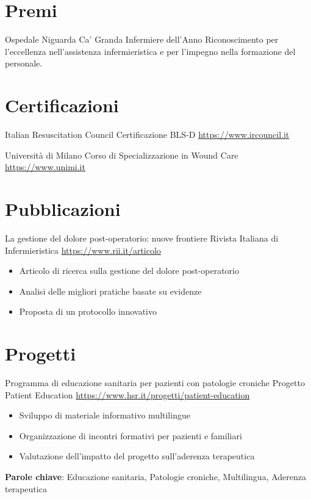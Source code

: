 \documentclass[a4paper, serif, 10pt]{moderncv}
\begin{document}
\section{Premi}

        {Ospedale Niguarda Ca' Granda}
        {Infermiere dell'Anno}
        {}
        {}
        {Riconoscimento per l'eccellenza nell'assistenza infermieristica e per l'impegno nella formazione del personale.}
\section{Certificazioni}

        {Italian Resuscitation Council}
        {Certificazione BLS-D}
        {\url{https://www.ircouncil.it}}
        {}
        {}

        {Università di Milano}
        {Corso di Specializzazione in Wound Care}
        {\url{https://www.unimi.it}}
        {}
        {}
\section{Pubblicazioni}

        {La gestione del dolore post-operatorio: nuove frontiere}
        {Rivista Italiana di Infermieristica}
        {\url{https://www.rii.it/articolo}}
        {}
        {\begin{itemize}
\item Articolo di ricerca sulla gestione del dolore post-operatorio
\item Analisi delle migliori pratiche basate su evidenze
\item Proposta di un protocollo innovativo
\end{itemize}}
\section{Progetti}

        {Programma di educazione sanitaria per pazienti con patologie croniche}
        {Progetto Patient Education}
        {\url{https://www.hsr.it/progetti/patient-education}}
        {}
        {\begin{itemize}
\item Sviluppo di materiale informativo multilingue
\item Organizzazione di incontri formativi per pazienti e familiari
\item Valutazione dell'impatto del progetto sull'aderenza terapeutica
\end{itemize}
\textbf{Parole chiave}: Educazione sanitaria, Patologie croniche, Multilingua, Aderenza terapeutica}
\end{document}
